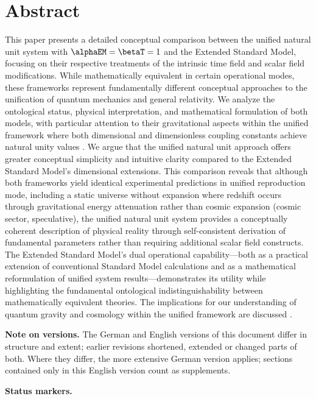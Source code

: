 \section*{Abstract}
	This paper presents a detailed conceptual comparison between the unified natural unit system with $\alphaEM = \betaT = 1$ and the Extended Standard Model, focusing on their respective treatments of the intrinsic time field and scalar field modifications. While mathematically equivalent in certain operational modes, these frameworks represent fundamentally different conceptual approaches to the unification of quantum mechanics and general relativity. We analyze the ontological status, physical interpretation, and mathematical formulation of both models, with particular attention to their gravitational aspects within the unified framework where both dimensional and dimensionless coupling constants achieve natural unity values \cite{pascher_unified_2025}. We argue that the unified natural unit approach offers greater conceptual simplicity and intuitive clarity compared to the Extended Standard Model's dimensional extensions. This comparison reveals that although both frameworks yield identical experimental predictions in unified reproduction mode, including a static universe without expansion where redshift occurs through gravitational energy attenuation rather than cosmic expansion (cosmic sector, speculative), the unified natural unit system provides a conceptually coherent description of physical reality through self-consistent derivation of fundamental parameters rather than requiring additional scalar field constructs. The Extended Standard Model's dual operational capability—both as a practical extension of conventional Standard Model calculations and as a mathematical reformulation of unified system results—demonstrates its utility while highlighting the fundamental ontological indistinguishability between mathematically equivalent theories. The implications for our understanding of quantum gravity and cosmology within the unified framework are discussed \cite{pascher_lagrangian_2025,pascher_beta_derivation_2025}.

	\medskip\noindent\textbf{Note on versions.} The German and English versions of this document differ in structure and extent; earlier revisions shortened, extended or changed parts of both. Where they differ, the more extensive German version applies; sections contained only in this English version count as supplements.


	\medskip\noindent\textbf{Status markers.}
	

